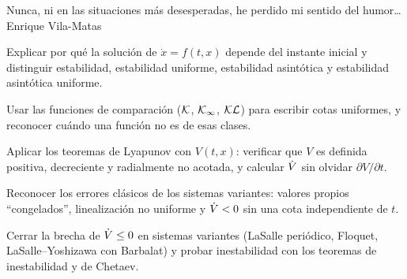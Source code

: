 
  {Nunca, ni en las situaciones más desesperadas, he perdido mi sentido del humor\ldots}
  {Enrique Vila-Matas}

\begin{objetivos}
  \item Explicar por qué la solución de $\dot x=f(t,x)$ depende del instante inicial y distinguir estabilidad, estabilidad uniforme, estabilidad asintótica y estabilidad asintótica uniforme.
  \item Usar las funciones de comparación ($\mathcal{K}$, $\mathcal{K}_{\infty}$, $\mathcal{KL}$) para escribir cotas uniformes, y reconocer cuándo una función no es de esas clases.
  \item Aplicar los teoremas de Lyapunov con $V(t,x)$: verificar que $V$ es definida positiva, decreciente y radialmente no acotada, y calcular $\dot V$ sin olvidar $\partial V/\partial t$.
  \item Reconocer los errores clásicos de los sistemas variantes: valores propios ``congelados'', linealización no uniforme y $\dot V<0$ sin una cota independiente de $t$.
  \item Cerrar la brecha de $\dot V\le0$ en sistemas variantes (LaSalle periódico, Floquet, LaSalle--Yoshizawa con Barbalat) y probar inestabilidad con los teoremas de inestabilidad y de Chetaev.
\end{objetivos}









